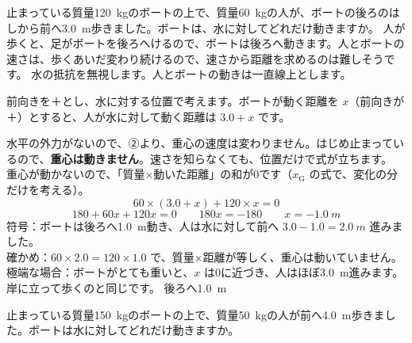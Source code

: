 \label{ph:力-3:ex6}
\begin{phreidai}[ボートの上を歩く]
止まっている質量\qty{120}{kg}のボートの上で、質量\qty{60}{kg}の人が、ボートの後ろのはしから前へ\qty{3.0}{m}歩きました。ボートは、水に対してどれだけ動きますか。
\phbamen
人が歩くと、足がボートを後ろへけるので、ボートは後ろへ動きます。人とボートの速さは、歩くあいだ変わり続けるので、速さから距離を求めるのは難しそうです。
\phmushi
水の抵抗を無視します。人とボートの動きは一直線上とします。
\phzu
\noindent\begin{minipage}[c]{0.5\linewidth}\centering
{}
\end{minipage}\hfill
\begin{minipage}[c]{0.47\linewidth}\raggedright
前向きを＋とし、水に対する位置で考えます。ボートが動く距離を $x$（前向きが＋）とすると、人が水に対して動く距離は $3.0+x$ です。
\end{minipage}
\phriyu
水平の外力がないので、②より、重心の速度は変わりません。はじめ止まっているので、\textbf{重心は動きません}。速さを知らなくても、位置だけで式が立ちます。
\phtateru
重心が動かないので、「質量×動いた距離」の和が0です（$x_{\mathrm G}$ の式で、変化の分だけを考える）。
\[60\times(3.0+x)+120\times x=0\]
\phtoku
\[180+60x+120x=0\qquad 180x=-180\qquad x=\qty{-1.0}{m}\]
\phtashikame
符号：ボートは後ろへ\qty{1.0}{m}動き、人は水に対して前へ $3.0-1.0=\qty{2.0}{m}$ 進みました。\\
確かめ：$60\times2.0=120\times1.0$ で、質量×距離が等しく、重心は動いていません。\\
極端な場合：ボートがとても重いと、$x$ は0に近づき、人はほぼ\qty{3.0}{m}進みます。岸に立って歩くのと同じです。
\kotae 後ろへ\qty{1.0}{m}
\end{phreidai}
\begin{jibun}
止まっている質量\qty{150}{kg}のボートの上で、質量\qty{50}{kg}の人が前へ\qty{4.0}{m}歩きました。ボートは水に対してどれだけ動きますか。
\end{jibun}

